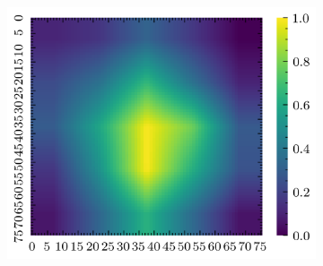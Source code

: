 \documentclass[../document.tex]{subfiles}
\begin{document}
\begin{figure}[H]
\begin{subfigure}[b]{0.19\textwidth}
        \includegraphics[width=\linewidth]{../img/5/quarry/best/grad-cam-2d-4.png}
    \end{subfigure}  


\end{figure}
\end{document}
